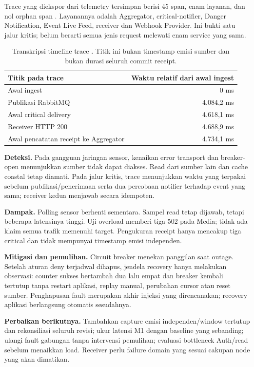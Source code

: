 Trace  yang diekspor dari telemetry tersimpan berisi 45 span, enam layanan, dan nol orphan span . Layanannya adalah Aggregator, critical-notifier, Danger Notification, Event Live Feed, receiver dan Webhook Provider. Ini bukti satu jalur kritis; belum berarti semua jenis request melewati enam service yang sama.
\begin{table}[htbp]\centering
\begin{tabularx}{\textwidth}{@{}Yr@{}}
\toprule Titik pada trace & Waktu relatif dari awal ingest\\\midrule
Awal ingest & 0 ms\\
Publikasi RabbitMQ & 4.084,2 ms\\
Awal critical delivery & 4.618,1 ms\\
Receiver HTTP 200 & 4.688,9 ms\\
Awal pencatatan receipt ke Aggregator & 4.734,1 ms\\\bottomrule
\end{tabularx}
\caption{Transkripsi timeline trace . Titik ini bukan timestamp emisi sumber dan bukan durasi seluruh commit receipt.}
\end{table}

\textbf{Deteksi.} Pada gangguan jaringan sensor, kenaikan error transport dan breaker-open menunjukkan sumber tidak dapat diakses. Read dari sumber lain dan cache coastal tetap diamati. Pada jalur kritis, trace menunjukkan waktu yang terpakai sebelum publikasi/penerimaan serta dua percobaan notifier terhadap event yang sama; receiver kedua menjawab secara idempoten.

\textbf{Dampak.} Polling sensor berhenti sementara. Sampel read tetap dijawab, tetapi beberapa latensinya tinggi. Uji overload memberi tiga 502 pada Media; tidak ada klaim semua trafik memenuhi target. Pengukuran receipt hanya mencakup tiga critical dan tidak mempunyai timestamp emisi independen.

\textbf{Mitigasi dan pemulihan.} Circuit breaker menekan panggilan saat outage. Setelah aturan deny terjadwal dihapus, jendela recovery hanya melakukan observasi: counter sukses bertambah dua lalu empat dan breaker kembali tertutup tanpa restart aplikasi, replay manual, perubahan cursor atau reset sumber. Penghapusan fault merupakan akhir injeksi yang direncanakan; recovery aplikasi berlangsung otomatis sesudahnya.

\textbf{Perbaikan berikutnya.} Tambahkan capture emisi independen/window tertutup dan rekonsiliasi seluruh revisi; ukur latensi M1 dengan baseline yang sebanding; ulangi fault gabungan tanpa intervensi pemulihan; evaluasi bottleneck Auth/read sebelum menaikkan load. Receiver perlu failure domain yang sesuai cakupan node yang akan dimatikan.

